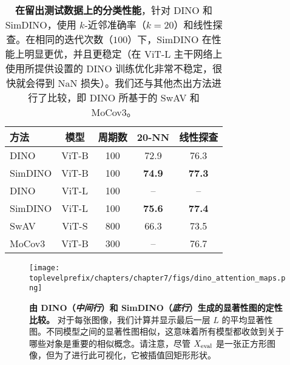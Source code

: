 \documentclass[../../book-main_zh.tex]{subfiles}
\begin{document}
\begin{table}
    \centering
    \begin{tabular}{@{}lcccc@{}} %
        \toprule
        方法 & 模型 & 周期数 & 20-NN & 线性探查
        \\
        \midrule 
        DINO & ViT-B & 100 & 72.9 & 76.3 \\
        SimDINO & ViT-B & 100 & \bf 74.9 & \bf 77.3 \\
        DINO & ViT-L & 100 & -- & -- \\
        SimDINO & ViT-L & 100 & \bf 75.6 & \bf 77.4 \\
        \midrule
        \color{gray} SwAV & \color{gray} ViT-S & \color{gray} 800 & \color{gray} 66.3 & \color{gray} 73.5 \\
        \color{gray} MoCov3 & \color{gray} ViT-B & \color{gray} 300  & \color{gray} -- & \color{gray} 76.7 \\
        \bottomrule
    \end{tabular}
    \caption{\small\textbf{在留出测试数据上的分类性能}，针对 DINO 和 SimDINO，使用 \(k\)-近邻准确率（\(k = 20\)）和线性探查。在相同的迭代次数（\(100\)）下，SimDINO 在性能上明显更优，并且更稳定（在 ViT-L 主干网络上使用所提供设置的 DINO 训练优化非常不稳定，很快就会得到 NaN 损失）。我们还与其他杰出方法进行了比较，即 DINO 所基于的 SwAV 和 MoCov3。}
    \label{tab:dino_imagenet_linear_probing}
\end{table}

\begin{figure}
    \centering 
    \texttt{[image: \\toplevelprefix/chapters/chapter7/figs/dino\_attention\_maps.png]}
    \caption{\small\textbf{由 DINO（\textit{中间行}）和 SimDINO（\textit{底行}）生成的显著性图的定性比较。} 对于每张图像，我们计算并显示最后一层 \(L\) 的平均显著性图。不同模型之间的显著性图相似，这意味着所有模型都收敛到关于哪些对象是重要的相似概念。请注意，尽管 \(X_{\mathrm{eval}}\) 是一张正方形图像，但为了进行此可视化，它被插值回矩形形状。}
    \label{fig:dino_attention_maps_saliency}
\end{figure}
\end{document}
